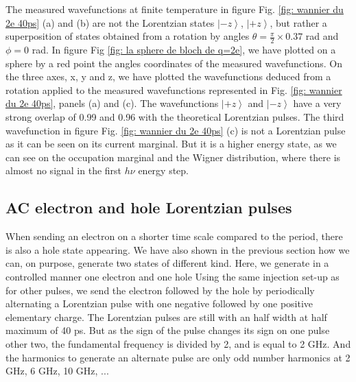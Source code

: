 The measured wavefunctions at finite temperature in figure Fig. \ref{fig: wannier du 2e 40ps} (a) and (b) are not the Lorentzian states $\left|-z\right>$, $\left|+z\right>$, but rather a superposition of states obtained from a rotation by angles
$\theta = \frac{\pi}{2}\times0.37$ rad and $\phi = 0$ rad.
In figure Fig \ref{fig: la sphere de bloch de q=2e}, we have plotted on a sphere by a red point the angles coordinates of the measured wavefunctions.
On the three axes, x, y and z, we have plotted the wavefunctions deduced from a rotation applied to the measured wavefunctions represented in Fig. \ref{fig: wannier du 2e 40ps}, panels (a) and (c). The wavefunctions $\left|+z\right>$ and $\left|-z\right>$ have a very strong overlap of 0.99 and 0.96 with the theoretical Lorentzian pulses. 
The third wavefunction in figure Fig. \ref{fig: wannier du 2e 40ps} (c) is not a Lorentzian pulse as it can be seen on its current marginal.
But it is a higher energy state, as we can see on the occupation marginal and the Wigner distribution, where there is almost no signal in the first $h\nu$ energy step.

\subsection{AC electron and hole Lorentzian pulses}

When sending an electron on a shorter time scale compared to the period, there is also a hole state appearing.
We have also shown in the previous section how we can, on purpose, generate two states of different kind.
Here, we generate in a controlled manner one electron and one hole
Using the same injection set-up as for other pulses, we send the electron followed by the hole by periodically alternating a Lorentzian pulse with one negative followed by one positive elementary charge.
The Lorentzian pulses are still with an half width at half maximum of 40 ps.
But as the sign of the pulse changes its sign on one pulse other two, the fundamental frequency is divided by 2, and is equal to 2 GHz.
And the harmonics to generate an alternate pulse are only odd number harmonics at 2 GHz, 6 GHz, 10 GHz, ...

